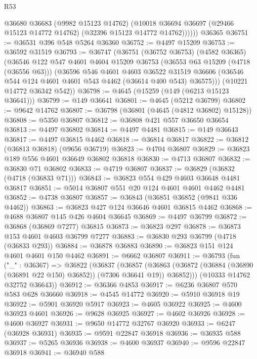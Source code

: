 \begin{lexlean}{R53}
\begin{coremodule}
            @36680
            @36683
            (@9982 @15123 @14762)
            (@10018 @36694 @36697 (@29466 @15123 @14772 @14762) (@32396 @15123 @14772 @14762))))))
    @36365
@36751 := @36531 @396 @548 @5264 @36360
@36752 := @4497 @15209
@36753 := @36592 @31519
@36793 := @36747
    (@36751
      (@36752 @36753)
      (@4582 @36365)
      (@36546
        @122
        @547
        @4601
        @4604
        @15209
        @36753
        (@36553 @63 @15209 (@4718 (@36556 @63)))
        (@36596
          @546
          @4601
          @4603
          @36522
          @31519
          @36606
          (@36546 @544 @124 @4601 @4601 @543 @4462 (@36614 @400 @543) @36575)))
      (@10221 @14772 @36342 @542))
@36798 := @4645 (@15259 (@149 (@6213 @15123 @36641)))
@36799 := @149 @36641
@36801 := @4645 (@5212 @36799)
@36802 := @9642 @14762
@36807 := @36798 (@36801 (@4645 (@4812 @36802) @15128))
@36808 := @5350 @36807
@36812 := @36808 @421 @557 @36650 @36654
@36813 := @4497 @36802
@36814 := @4497 @4481
@36815 := @149 @36643
@36817 := @4497 @36815 @4462
@36818 := @36814 @36817
@36822 := @36812 (@36813 @36818) (@9656 @36719)
@36823 := @4704 @36807
@36829 := @36823 @189 @556 @4601 @36649 @36802 @36818
@36830 := @4713 @36807
@36832 := @36830 @71 @36802
@36833 := @4719 @36807
@36837 := @36829 (@36832 (@4718 (@36833 @71)))
@36843 := @36823 @554 @429 @4603 @36648 @4481 @36817
@36851 := @5014 @36807 @551 @20 @124 @4601 @4601 @4462 @4481
@36852 := @4738 @36807
@36857 := @36843 (@36851 @36852 (@9841 @336 @4462))
@36863 := @36823 @427 @124 @36646 @4601 @36815 @4462
@36868 := @4688 @36807 @145 @426 @4604 @36645
@36869 := @4497 @36799
@36872 := @36868 (@36869 @7277) @36815
@36873 := @36823 @297
@36878 := @36873 @153 @4601 @4603 @36799 @7277
@36883 := @36830 @293 @36799 (@4718 (@36833 @293))
@36884 := @36878 @36883
@36890 := @36823 @151 @124 @4601 @4601 @150 @4462
@36891 := @6662 @36807
@36911 := @36793
    (fun ("_" : @36367) =>
    @36822
      (@36837
        (@36857
          (@36863 (@36872 (@36884 (@36890 (@36891 @22 @150) @36852)) (@7306 @36641 @19)) @36852)))
      (@10333 @14762 @32752 @36643))
@36912 := @36366 @4853
@36917 := @6236 @36807 @570 @583 @628 @36660
@36918 := @4545 @14772
@36920 := @5910 @36918 @19
@36922 := @5901 @36920 @5917
@36923 := @4605 @36922
@36925 := @4600 @36923 @4601
@36926 := @9628 @36925
@36927 := @4602 @36926
@36928 := @4600 @36927
@36931 := @9650 @14772 @32767 @36920
@36933 := @6247 (@36928 @36931)
@36935 := @9591 @22847 @36918
@36936 := @36935 @588
@36937 := @5265 @36936
@36938 := @4600 @36937
@36940 := @9596 @22847 @36918
@36941 := @36940 @588

\end{coremodule}
\end{lexlean}
